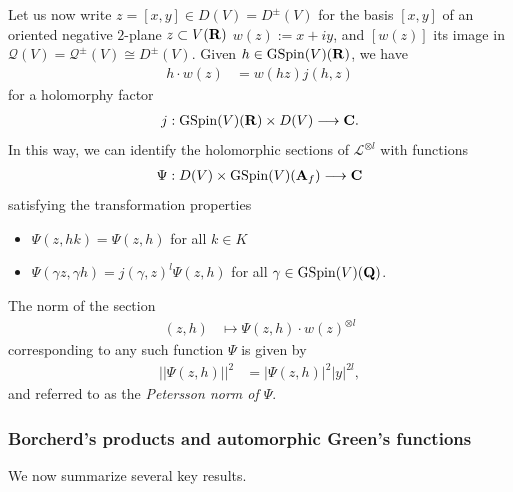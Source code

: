 \documentclass{amsart}
\theoremstyle{definition}
\theoremstyle{definition}
\theoremstyle{definition}
\begin{document}
Let us now write $z=[x, y] \in D(V) = D^{\pm}(V)$ for the basis $[x, y]$ of an oriented negative $2$-plane $z \subset V({\bf{R}})$ 
$w(z) := x + iy$, and $[w(z)]$ its image in $\mathcal{Q}(V) = \mathcal{Q}^{\pm}(V) \cong D^{\pm}(V)$. 
Given $h \in \operatorname{GSpin}(V)({\bf{R}})$, we have  
\begin{align*} h \cdot w(z) &= w(h z) j(h, z) \end{align*}
for a holomorphy factor \begin{align*} j: \operatorname{GSpin}(V)({\bf{R}}) \times D(V) \longrightarrow {\bf{C}}. \end{align*}
In this way, we can identify the holomorphic sections of $\mathcal{L}^{\otimes l}$ with functions 
\begin{align*} \Psi: D(V) \times \operatorname{GSpin}(V)({\bf{A}}_f) \longrightarrow {\bf{C}} \end{align*}
satisfying the transformation properties
\begin{itemize}
\item $\Psi(z, hk) = \Psi(z, h)$ for all $k \in K$ 
\item $\Psi(\gamma z, \gamma h)  = j(\gamma, z)^l \Psi(z, h)$ for all $\gamma \in \operatorname{GSpin}(V)({\bf{Q}})$. \end{itemize}
The norm of the section 
\begin{align*} (z, h) &\longmapsto \Psi(z, h) \cdot w(z)^{\otimes l}  \end{align*} 
corresponding to any such function $\Psi$ is given by 
\begin{align*} \vert \vert \Psi(z, h) \vert \vert^2 &= \vert \Psi(z, h) \vert^2 \vert y \vert^{2l}, \end{align*}
and referred to as the {\it{Petersson norm of $\Psi$}}.

\subsubsection{Borcherd's products and automorphic Green's functions}

We now summarize several key results. 
\end{document}
